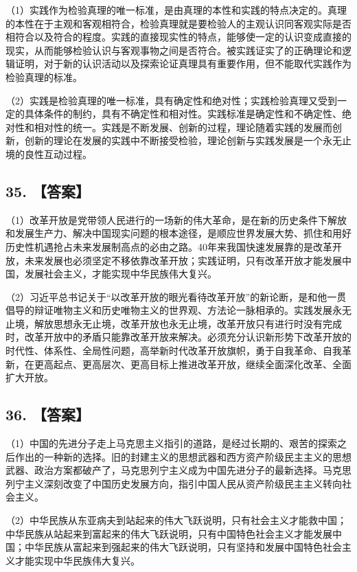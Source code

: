 \documentclass[UTF8,11pt]{ctexart}
\begin{document}
（1）实践作为检验真理的唯一标准，是由真理的本性和实践的特点决定的。真理的本性在于主观和客观相符合，检验真理就是要检验人的主观认识同客观实际是否相符合以及符合的程度。实践的直接现实性的特点，能够使一定的认识变成直接的现实，从而能够检验认识与客观事物之间是否符合。被实践证实了的正确理论和逻辑证明，对于新的认识活动以及探索论证真理具有重要作用，但不能取代实践作为检验真理的标准。


（2）实践是检验真理的唯一标准，具有确定性和绝对性；实践检验真理又受到一定的具体条件的制约，具有不确定性和相对性。实践标准是确定性和不确定性、绝对性和相对性的统一。实践是不断发展、创新的过程，理论随着实践的发展而创新，创新的理论在发展的实践中不断接受检验，理论创新与实践发展是一个永无止境的良性互动过程。


\subsection*{35. 【答案】}

（1）改革开放是党带领人民进行的一场新的伟大革命，是在新的历史条件下解放和发展生产力、解决中国现实问题的根本途径，是顺应世界发展大势、抓住和用好历史性机遇抢占未来发展制高点的必由之路。40年来我国快速发展靠的是改革开放，未来发展也必须坚定不移依靠改革开放；实践证明，只有改革开放才能发展中国，发展社会主义，才能实现中华民族伟大复兴。


（2）习近平总书记关于“以改革开放的眼光看待改革开放”的新论断，是和他一贯倡导的辩证唯物主义和历史唯物主义的世界观、方法论一脉相承的。实践发展永无止境，解放思想永无止境，改革开放也永无止境，改革开放只有进行时没有完成时，改革开放中的矛盾只能靠改革开放来解决。必须充分认识新形势下改革开放的时代性、体系性、全局性问题，高举新时代改革开放旗帜，勇于自我革命、自我革新，在更高起点、更高层次、更高目标上推进改革开放，继续全面深化改革、全面扩大开放。


\subsection*{36. 【答案】}

（1）中国的先进分子走上马克思主义指引的道路，是经过长期的、艰苦的探索之后作出的一种新的选择。旧的封建主义的思想武器和西方资产阶级民主主义的思想武器、政治方案都破产了，马克思列宁主义成为中国先进分子的最新选择。马克思列宁主义深刻改变了中国历史发展方向，指引中国人民从资产阶级民主主义转向社会主义。


（2）中华民族从东亚病夫到站起来的伟大飞跃说明，只有社会主义才能救中国；中华民族从站起来到富起来的伟大飞跃说明，只有中国特色社会主义才能发展中国；中华民族从富起来到强起来的伟大飞跃说明，只有坚持和发展中国特色社会主义才能实现中华民族伟大复兴。
\end{document}
